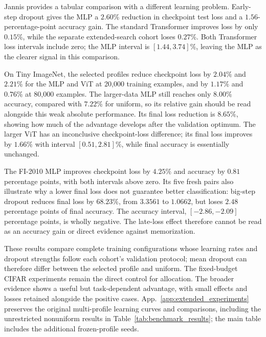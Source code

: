 Jannis provides a tabular comparison with a different learning problem. Early-step dropout gives the MLP a $2.60\%$ reduction in checkpoint test loss and a $1.56$-percentage-point accuracy gain. The standard Transformer improves loss by only $0.15\%$, while the separate extended-search cohort loses $0.27\%$. Both Transformer loss intervals include zero; the MLP interval is $[1.44,3.74]\%$, leaving the MLP as the clearer signal in this comparison.

On Tiny ImageNet, the selected profiles reduce checkpoint loss by $2.04\%$ and $2.21\%$ for the MLP and ViT at 20,000 training examples, and by $1.17\%$ and $0.76\%$ at 80,000 examples. The larger-data MLP still reaches only $8.00\%$ accuracy, compared with $7.22\%$ for uniform, so its relative gain should be read alongside this weak absolute performance. Its final loss reduction is $8.65\%$, showing how much of the advantage develops after the validation optimum. The larger ViT has an inconclusive checkpoint-loss difference; its final loss improves by $1.66\%$ with interval $[0.51,2.81]\%$, while final accuracy is essentially unchanged.

The FI-2010 MLP improves checkpoint loss by $4.25\%$ and accuracy by $0.81$ percentage points, with both intervals above zero. Its five fresh pairs also illustrate why a lower final loss does not guarantee better classification: big-step dropout reduces final loss by $68.23\%$, from $3.3561$ to $1.0662$, but loses $2.48$ percentage points of final accuracy. The accuracy interval, $[-2.86,-2.09]$ percentage points, is wholly negative. The late-loss effect therefore cannot be read as an accuracy gain or direct evidence against memorization.

These results compare complete training configurations whose learning rates and dropout strengths follow each cohort's validation protocol; mean dropout can therefore differ between the selected profile and uniform. The fixed-budget CIFAR experiments remain the direct control for allocation. The broader evidence shows a useful but task-dependent advantage, with small effects and losses retained alongside the positive cases. App.~\ref{app:extended_experiments} preserves the original multi-profile learning curves and comparisons, including the unrestricted nonuniform results in Table~\ref{tab:benchmark_results}; the main table includes the additional frozen-profile seeds.

